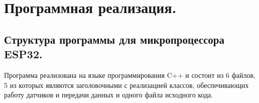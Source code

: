 \documentclass[a4document]{article}
\begin{document}
{
\newpage
\section*{Программная реализация.} 

\subsection*{Структура программы для микропроцессора ESP32.}
Программа реализована на языке программирования C++ и состоит из 6 файлов, 5 из которых являются заголовочными с реализацией 
классов, обеспечивающих работу датчиков и передачи данных и одного файла исходного кода.

}
\end{document}

